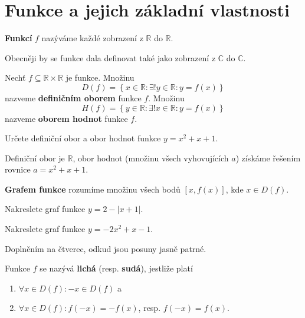 \section{Funkce a jejich základní vlastnosti}
\begin{definition}
  \textbf{Funkcí} $f$ nazýváme každé zobrazení z $\mathbb R$ do $\mathbb R$.
\end{definition}

\begin{pozn}
  Obecněji by se funkce dala definovat také jako zobrazení z $\mathbb C$ do $\mathbb C$.
\end{pozn}

\begin{definition}
  Nechť $f\subseteq \mathbb R \times \mathbb R$ je funkce. Množinu
  \[
    D(f) = \left  \{ x \in \mathbb R:\exists ! y \in \mathbb R:y=f(x) \right \}
  \]
  nazveme \textbf{definičním oborem} funkce $f$. Množinu
  \[
    H(f) = \left  \{ y \in \mathbb R:\exists ! x \in \mathbb R:y=f(x) \right \}
  \]
  nazveme \textbf{oborem hodnot} funkce $f$.
\end{definition}

\begin{priklad}
Určete definiční obor a obor hodnot funkce $y=x^2+x+1.$
\end{priklad}

\begin{reseni}
Definiční obor je $\mathbb R$, obor hodnot (množinu všech vyhovujících $a$)
získáme řešením rovnice $a=x^2+x+1.$
\end{reseni}

\begin{pozn}
  \textbf{Grafem funkce} rozumíme množinu všech bodů $[x,f(x)]$, kde $x\in D(f).$
\end{pozn}

\begin{priklad}
Nakreslete graf funkce $y=2-|x+1|.$
\end{priklad}

\begin{priklad}
Nakreslete graf funkce $y=-2x^2+x-1$.
\end{priklad}

\begin{reseni}
Doplněním na čtverec, odkud jsou posuny jasně patrné.
\end{reseni}

\begin{definition}
  Funkce $f$ se nazývá \textbf{lichá} (resp. \textbf{sudá}), jestliže platí
  \begin{enumerate}[$i.$]
    \item $\forall x \in D(f): -x \in D(f)$ a
  	\item $\forall x \in D(f): f(-x)=-f(x)$, resp. $f(-x)=f(x)$.
  \end{enumerate}
\end{definition}

